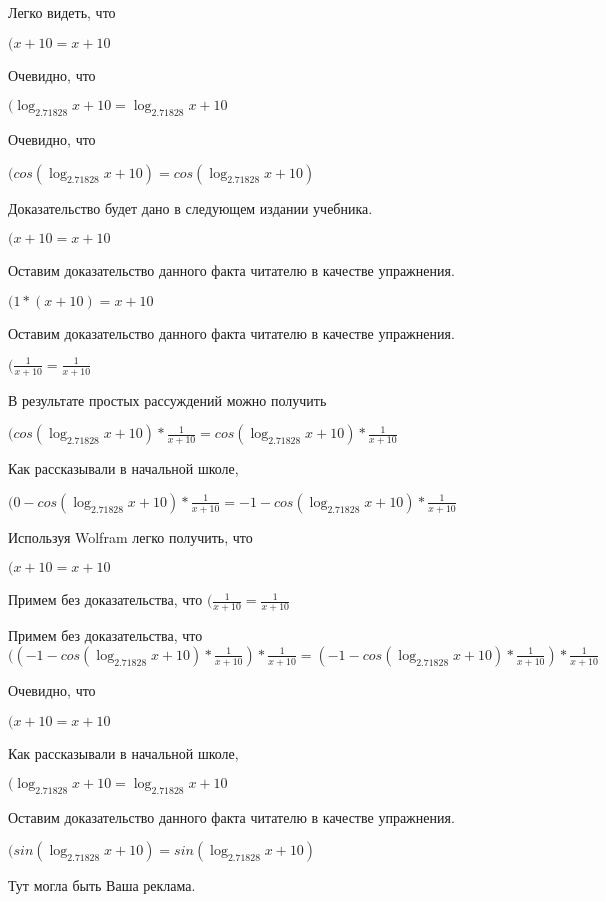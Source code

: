 \documentclass[12pt,a4paper,fleqn]{article}
\theoremstyle{definition}
\begin{document}
Легко видеть, что

$( x  +  10  =  x  +  10 $

Очевидно, что

$(\log_{ 2.71828 }{ x  +  10 } = \log_{ 2.71828 }{ x  +  10 }$

Очевидно, что

$(cos(\log_{ 2.71828 }{ x  +  10 }) = cos(\log_{ 2.71828 }{ x  +  10 })$

Доказательство будет дано в следующем издании учебника.

$( x  +  10  =  x  +  10 $

Оставим доказательство данного факта читателю в качестве упражнения.

$( 1  * ( x  +  10 ) =  x  +  10 $

Оставим доказательство данного факта читателю в качестве упражнения.

$(\frac{ 1 }{ x  +  10 }
 = \frac{ 1 }{ x  +  10 }
$

В результате простых рассуждений можно получить

$(cos(\log_{ 2.71828 }{ x  +  10 }) * \frac{ 1 }{ x  +  10 }
 = cos(\log_{ 2.71828 }{ x  +  10 }) * \frac{ 1 }{ x  +  10 }
$

Как рассказывали в начальной школе,

$( 0  - cos(\log_{ 2.71828 }{ x  +  10 }) * \frac{ 1 }{ x  +  10 }
 =  -1  - cos(\log_{ 2.71828 }{ x  +  10 }) * \frac{ 1 }{ x  +  10 }
$

Используя Wolfram легко получить, что

$( x  +  10  =  x  +  10 $

Примем без доказательства, что
$(\frac{ 1 }{ x  +  10 }
 = \frac{ 1 }{ x  +  10 }
$

Примем без доказательства, что
$(( -1  - cos(\log_{ 2.71828 }{ x  +  10 }) * \frac{ 1 }{ x  +  10 }
) * \frac{ 1 }{ x  +  10 }
 = ( -1  - cos(\log_{ 2.71828 }{ x  +  10 }) * \frac{ 1 }{ x  +  10 }
) * \frac{ 1 }{ x  +  10 }
$

Очевидно, что

$( x  +  10  =  x  +  10 $

Как рассказывали в начальной школе,

$(\log_{ 2.71828 }{ x  +  10 } = \log_{ 2.71828 }{ x  +  10 }$

Оставим доказательство данного факта читателю в качестве упражнения.

$(sin(\log_{ 2.71828 }{ x  +  10 }) = sin(\log_{ 2.71828 }{ x  +  10 })$

Тут могла быть Ваша реклама.
\end{document}
